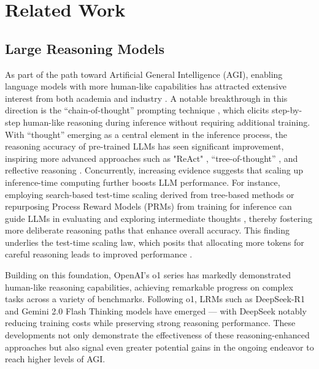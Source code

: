 \section{Related Work}
\subsection{Large Reasoning Models}

As part of the path toward Artificial General Intelligence (AGI), enabling language models with more human-like capabilities has attracted extensive interest from both academia and industry \citep{llama3modelcard,anil2023palm,openai-chatgpt,GPT4report,team2023gemini,NEURIPS2024_0939f13f,joren2024sufficient,zhang2024mllm, zhang2024artist, yao2022react,liu2024visual,zhang-etal-2023-reaugkd,openai2024o3mini,guo2025deepseek,zhong2024evaluationopenaio1opportunities}. A notable breakthrough in this direction is the “chain-of-thought” prompting technique \citep{wei2023chainofthoughtpromptingelicitsreasoning}, which elicits step-by-step human-like reasoning during inference without requiring additional training. With “thought” emerging as a central element in the inference process, the reasoning accuracy of pre-trained LLMs has seen significant improvement, inspiring more advanced approaches such as "ReAct" \citep{yao2022react}, “tree-of-thought” \citep{yao2024tree}, and reflective reasoning \citep{Renze2024SelfReflectionIL,zeng2024perceivereflectplandesigning}. Concurrently, increasing evidence suggests that scaling up inference-time computing further boosts LLM performance. For instance, employing search-based test-time scaling derived from tree-based methods or repurposing Process Reward Models (PRMs) from training for inference can guide LLMs in evaluating and exploring intermediate thoughts \citep{zhang2024restmcts,openai2024openaio1card}, thereby fostering more deliberate reasoning paths that enhance overall accuracy. This finding underlies the test-time scaling law, which posits that allocating more tokens for careful reasoning leads to improved performance \citep{openai2024openaio1card}.

Building on this foundation, OpenAI’s o1 series \citep{zhong2024evaluationopenaio1opportunities} has markedly demonstrated human-like reasoning capabilities, achieving remarkable progress on complex tasks across a variety of benchmarks. Following o1, LRMs such as DeepSeek-R1 \citep{guo2025deepseek} and Gemini 2.0 Flash Thinking \citep{ deepmind2024FlashThinking} models have emerged — with DeepSeek notably reducing training costs while preserving strong reasoning performance. These developments not only demonstrate the effectiveness of these reasoning-enhanced approaches but also signal even greater potential gains in the ongoing endeavor to reach higher levels of AGI.

